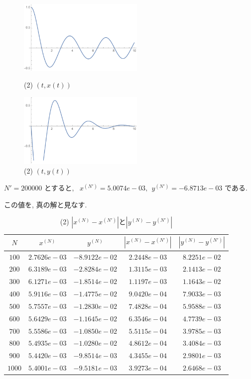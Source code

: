\documentclass[11pt]{jsarticle}
\begin{document}
\begin{figure}[htbp]
\centering
\begin{minipage}{0.45\columnwidth}
\centering
\includegraphics[width=6cm]{images/2_x.pdf}
\caption{(2) $(t, x(t))$}
\end{minipage}
%
\begin{minipage}{0.45\columnwidth}
\centering
\includegraphics[width=6cm]{images/2_y.pdf}
\caption{(2) $(t, y(t))$}
\end{minipage}
\end{figure}

$N' = 200000$ とすると, \ $x^{(N')} = 5.0074e-03, \ \ y^{(N')} = -6.8713e-03$ である. \par
この値を, 真の解と見なす. 
\begin{table}[htbp]
\centering
\begin{tabular}{|c||c|c|c|c|} \hline
\textbf{$N$} & \textbf{$x^{(N)}$} & \textbf{$y^{(N)}$} & \textbf{$|x^{(N)}-x^{(N')}|$} & \textbf{$|y^{(N)}-y^{(N')}|$} \\ \hline
$100$ & $2.7626e-03$ & $-8.9122e-02$ & $2.2448e-03$ & $8.2251e-02$ \\ \hline
$200$ & $6.3189e-03$ & $-2.8284e-02$ & $1.3115e-03$ & $2.1413e-02$ \\ \hline
$300$ & $6.1271e-03$ & $-1.8514e-02$ & $1.1197e-03$ & $1.1643e-02$ \\ \hline
$400$ & $5.9116e-03$ & $-1.4775e-02$ & $9.0420e-04$ & $7.9033e-03$ \\ \hline
$500$ & $5.7557e-03$ & $-1.2830e-02$ & $7.4828e-04$ & $5.9588e-03$ \\ \hline
$600$ & $5.6429e-03$ & $-1.1645e-02$ & $6.3546e-04$ & $4.7739e-03$ \\ \hline
$700$ & $5.5586e-03$ & $-1.0850e-02$ & $5.5115e-04$ & $3.9785e-03$ \\ \hline
$800$ & $5.4935e-03$ & $-1.0280e-02$ & $4.8612e-04$ & $3.4084e-03$ \\ \hline
$900$ & $5.4420e-03$ & $-9.8514e-03$ & $4.3455e-04$ & $2.9801e-03$ \\ \hline
$1000$ & $5.4001e-03$ & $-9.5181e-03$ & $3.9273e-04$ & $2.6468e-03$ \\ \hline
\end{tabular}
\caption{(2) $|x^{(N)}-x^{(N')}|$と$|y^{(N)}-y^{(N')}|$}
\end{table}
\end{document}
